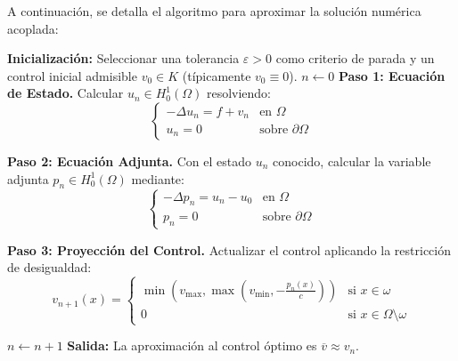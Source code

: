 \documentclass[11pt,a4paper]{article}
\begin{document}
	A continuación, se detalla el algoritmo para aproximar la solución numérica acoplada:
	
	\begin{algorithm}[H]
		\caption{Método del Gradiente Proyectado (Esquema de Punto Fijo)}
		\begin{algorithmic}[1]
			\State \textbf{Inicialización:} Seleccionar una tolerancia $\varepsilon > 0$ como criterio de parada y un control inicial admisible $v_0 \in K$ (típicamente $v_0 \equiv 0$).
			\State $n \gets 0$
			\Repeat
			\State \textbf{Paso 1: Ecuación de Estado.} Calcular $u_n \in H^1_0(\Omega)$ resolviendo:
			\begin{equation*}
				\begin{cases}
					-\Delta u_n = f + v_n & \text{en } \Omega \\
					u_n = 0 & \text{sobre } \partial\Omega
				\end{cases}
			\end{equation*}
			
			\State \textbf{Paso 2: Ecuación Adjunta.} Con el estado $u_n$ conocido, calcular la variable adjunta $p_n \in H^1_0(\Omega)$ mediante:
			\begin{equation*}
				\begin{cases}
					-\Delta p_n = u_n - u_0 & \text{en } \Omega \\
					p_n = 0 & \text{sobre } \partial\Omega
				\end{cases}
			\end{equation*}
			
			\State \textbf{Paso 3: Proyección del Control.} Actualizar el control aplicando la restricción de desigualdad:
			\begin{equation*}
				v_{n+1}(x) = 
				\begin{cases} 
					\min\left(v_{\max}, \max\left(v_{\min}, -\frac{p_n(x)}{c}\right)\right) & \text{si } x \in \omega \\
					0 & \text{si } x \in \Omega \setminus \omega
				\end{cases}
			\end{equation*}
			
			\State $n \gets n + 1$
			\State \textbf{Salida:} La aproximación al control óptimo es $\overline{v} \approx v_n$.
		\end{algorithmic}
	\end{algorithm}
	
\end{document}

